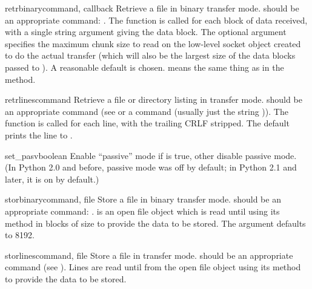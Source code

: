 \begin{methoddesc}{retrbinary}{command,
    callback}
Retrieve a file in binary transfer mode.   should be an
appropriate  command: .
The  function is called for each block of data received,
with a single string argument giving the data block.
The optional  argument specifies the maximum chunk size to
read on the low-level socket object created to do the actual transfer
(which will also be the largest size of the data blocks passed to
).  A reasonable default is chosen.  means the
same thing as in the  method.
\end{methoddesc}

\begin{methoddesc}{retrlines}{command}
Retrieve a file or directory listing in \ASCII{} transfer mode.
 should be an appropriate  command (see
 or a  command (usually just the string
)).  The  function is called for each line,
with the trailing CRLF stripped.  The default  prints
the line to .
\end{methoddesc}

\begin{methoddesc}{set_pasv}{boolean}
Enable ``passive'' mode if  is true, other disable
passive mode.  (In Python 2.0 and before, passive mode was off by
default; in Python 2.1 and later, it is on by default.)
\end{methoddesc}

\begin{methoddesc}{storbinary}{command, file}
Store a file in binary transfer mode.   should be an
appropriate  command: .
 is an open file object which is read until \EOF{} using its
 method in blocks of size  to provide the
data to be stored.  The  argument defaults to 8192.
\end{methoddesc}

\begin{methoddesc}{storlines}{command, file}
Store a file in \ASCII{} transfer mode.   should be an
appropriate  command (see ).  Lines are
read until \EOF{} from the open file object  using its
 method to provide the data to be stored.
\end{methoddesc}

